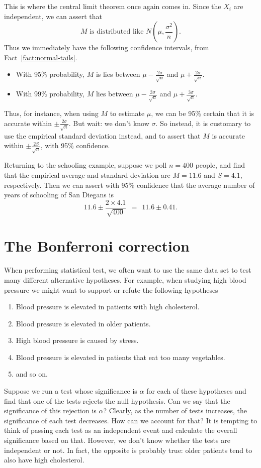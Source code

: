 This is where the central limit theorem once again comes in. Since the $X_i$ are
independent, we can assert that
$$ M \mbox{\ is distributed like\ } N\left(\mu, \frac{\sigma^2}{n} \right) .$$
Thus we immediately have the following confidence intervals, from 
Fact~\ref{fact:normal-tails}.
\begin{itemize}
\item With 95\% probability, $M$ is lies between $\mu-\frac{2\sigma}{\sqrt{n}}$ and 
$\mu+\frac{2\sigma}{\sqrt{n}}$.
\item With 99\% probability, $M$ lies between $\mu-\frac{3\sigma}{\sqrt{n}}$ and 
$\mu+\frac{3\sigma}{\sqrt{n}}$.
\end{itemize}
Thus, for instance, when using $M$ to estimate $\mu$, we can be 95\% certain that 
it is accurate within $\pm \frac{2\sigma}{\sqrt{n}}$. But wait: we don't know
$\sigma$. So instead, it is customary to use the empirical standard deviation
instead, and to assert that $M$ is accurate within  $\pm \frac{2 S}{\sqrt{n}}$,
with 95\% confidence.

Returning to the schooling example, suppose we poll $n = 400$ people, and find 
that the empirical average and standard deviation are $M = 11.6$ and $S = 4.1$,
respectively. Then we can assert with 95\% confidence that the average number
of years of schooling of San Diegans is
$$ 11.6 \pm \frac{2 \times 4.1}{\sqrt{400}} \ \ = \ \ 11.6 \pm 0.41 .$$

 
\section{The Bonferroni correction}
When performing statistical test, we often want to use the same data
set to test many different alternative hypotheses. For example, when
studying high blood pressure we might want to support or refute
the following hypotheses
\begin{enumerate}
\item Blood pressure is elevated in patients with high cholesterol.
\item Blood pressure is elevated in older patients.
\item High blood pressure is caused by stress.
\item Blood pressure is elevated in patients that eat too many
  vegetables.
\item and so on.
\end{enumerate}
Suppose we run a test whose significance is $\alpha$ for each of these
hypotheses and find that one of the tests rejects the null
hypothesis. Can we say that the significance of this rejection is
$\alpha$? Clearly, as the number of tests increases, the significance
of each test decreases. How can we account for that? It is tempting to
think of passing each test as an independent event and calculate the
overall significance based on that. However, we don't know whether the
tests are independent or not. In fact, the opposite is probably true:
older patients tend to also have high cholesterol.

